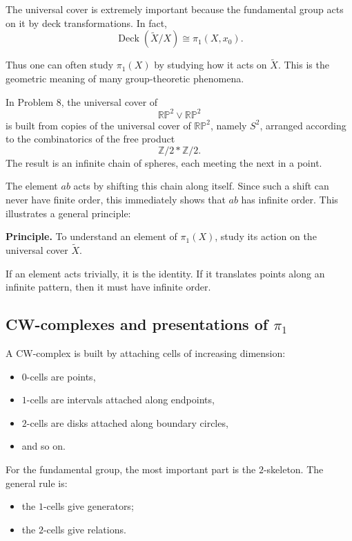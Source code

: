 \documentclass[12pt,a4paper]{article}
\DeclareMathOperator{\Deck}{Deck}
\theoremstyle{notespace}
\begin{document}
The universal cover is extremely important because the fundamental group acts on it by deck transformations. In fact,
\[
\Deck(\widetilde X/X)\cong \pi_1(X,x_0).
\]

Thus one can often study \(\pi_1(X)\) by studying how it acts on \(\widetilde X\). This is the geometric meaning of many group-theoretic phenomena.

In Problem 8, the universal cover of
\[
\mathbb{RP}^2\vee \mathbb{RP}^2
\]
is built from copies of the universal cover of \(\mathbb{RP}^2\), namely \(S^2\), arranged according to the combinatorics of the free product
\[
\mathbb Z/2 * \mathbb Z/2.
\]
The result is an infinite chain of spheres, each meeting the next in a point.

The element \(ab\) acts by shifting this chain along itself. Since such a shift can never have finite order, this immediately shows that \(ab\) has infinite order. This illustrates a general principle:

\medskip

\textbf{Principle.}
To understand an element of \(\pi_1(X)\), study its action on the universal cover \(\widetilde X\).

\medskip

If an element acts trivially, it is the identity. If it translates points along an infinite pattern, then it must have infinite order.

\subsection{CW-complexes and presentations of \(\pi_1\)}

A CW-complex is built by attaching cells of increasing dimension:
\begin{itemize}
	\item \(0\)-cells are points,
	\item \(1\)-cells are intervals attached along endpoints,
	\item \(2\)-cells are disks attached along boundary circles,
	\item and so on.
\end{itemize}

For the fundamental group, the most important part is the \(2\)-skeleton. The general rule is:

\begin{itemize}
	\item the \(1\)-cells give generators;
	\item the \(2\)-cells give relations.
\end{itemize}
\end{document}
